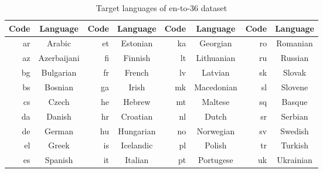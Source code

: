 \begin{table}[h]
\begin{tabular}{rc|rc|rc|rc}
\toprule
Code & Language & Code & Language & Code & Language & Code & Language \\
\midrule
ar & Arabic	  & et  & Estonian	&ka & Georgian 	 & ro & Romanian	\\
az & Azerbaijani  & fi  & Finnish	&lt & Lithuanian & ru & Russian 	\\
bg & Bulgarian	  & fr  & French	&lv & Latvian	 & sk & Slovak	\\
bs & Bosnian	  & ga  & Irish		&mk & Macedonian & sl & Slovene	\\
cs & Czech	  & he  & Hebrew	&mt & Maltese	 & sq & Basque	\\
da & Danish	  & hr  & Croatian	&nl & Dutch	 & sr & Serbian	\\
de & German	  & hu  & Hungarian	&no & Norwegian	 & sv & Swedish	\\
el & Greek	  & is  & Icelandic	&pl  & Polish	 & tr & Turkish	\\
es & Spanish	  & it  & Italian	&pt  & Portugese & uk & Ukrainian	\\
\bottomrule
\end{tabular}

\caption{Target languages of en-to-36 dataset}
\label{table:list_en-to-36}
\end{table}

